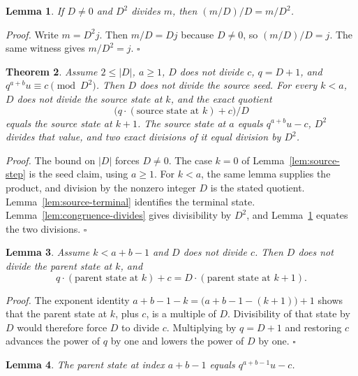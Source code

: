 \documentclass[11pt,letterpaper]{article}
\newtheorem{theorem}{Theorem}
\newtheorem{lemma}[theorem]{Lemma}
\newenvironment{proof}{\noindent\textit{Proof.}}{\hfill\(\square\)}
\begin{document}
\begin{lemma}
\label{lem:double-quotient}
If \(D\neq 0\) and \(D^2\) divides \(m\), then \((m/D)/D=m/D^2\).
\end{lemma}

\begin{proof}
Write \(m=D^2 j\). Then \(m/D=Dj\) because \(D\neq 0\), so \((m/D)/D=j\). The same witness gives \(m/D^2=j\).
\end{proof}

\begin{theorem}
\label{thm:saturated-source}
Assume \(2\le |D|\), \(a\ge 1\), \(D\) does not divide \(c\), \(q=D+1\), and \(q^{a+b}u\equiv c\pmod{D^2}\). Then \(D\) does not divide the source seed. For every \(k<a\), \(D\) does not divide the source state at \(k\), and the exact quotient
\[
\bigl(q\cdot(\text{source state at \(k\)})+c\bigr)/D
\]
equals the source state at \(k+1\). The source state at \(a\) equals \(q^{a+b}u-c\), \(D^2\) divides that value, and two exact divisions of it equal division by \(D^2\).
\end{theorem}

\begin{proof}
The bound on \(|D|\) forces \(D\neq 0\). The case \(k=0\) of Lemma~\ref{lem:source-step} is the seed claim, using \(a\ge 1\). For \(k<a\), the same lemma supplies the product, and division by the nonzero integer \(D\) is the stated quotient. Lemma~\ref{lem:source-terminal} identifies the terminal state. Lemma~\ref{lem:congruence-divides} gives divisibility by \(D^2\), and Lemma~\ref{lem:double-quotient} equates the two divisions.
\end{proof}

\begin{lemma}
\label{lem:parent-step}
Assume \(k<a+b-1\) and \(D\) does not divide \(c\). Then \(D\) does not divide the parent state at \(k\), and
\[
q\cdot(\text{parent state at \(k\)})+c
=D\cdot(\text{parent state at \(k+1\)}).
\]
\end{lemma}

\begin{proof}
The exponent identity \(a+b-1-k=\bigl(a+b-1-(k+1)\bigr)+1\) shows that the parent state at \(k\), plus \(c\), is a multiple of \(D\). Divisibility of that state by \(D\) would therefore force \(D\) to divide \(c\). Multiplying by \(q=D+1\) and restoring \(c\) advances the power of \(q\) by one and lowers the power of \(D\) by one.
\end{proof}

\begin{lemma}
\label{lem:parent-gate}
The parent state at index \(a+b-1\) equals \(q^{a+b-1}u-c\).
\end{lemma}
\end{document}
